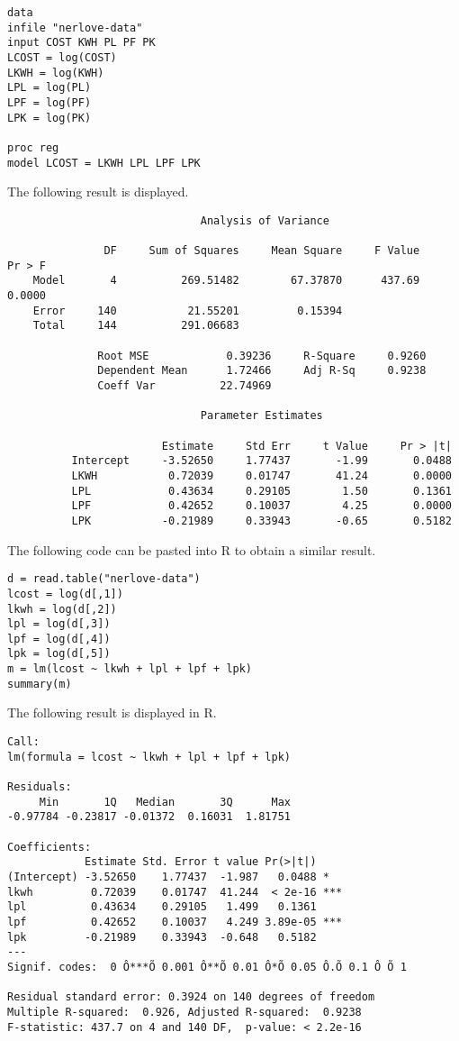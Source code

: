 \documentclass[12pt]{article}
\begin{document}
\begin{Verbatim}
data
infile "nerlove-data"
input COST KWH PL PF PK
LCOST = log(COST)
LKWH = log(KWH)
LPL = log(PL)
LPF = log(PF)
LPK = log(PK)

proc reg
model LCOST = LKWH LPL LPF LPK
\end{Verbatim}

The following result is displayed.

\begin{Verbatim}
                              Analysis of Variance

               DF     Sum of Squares     Mean Square     F Value     Pr > F
    Model       4          269.51482        67.37870      437.69     0.0000
    Error     140           21.55201         0.15394                       
    Total     144          291.06683                                       

              Root MSE            0.39236     R-Square     0.9260
              Dependent Mean      1.72466     Adj R-Sq     0.9238
              Coeff Var          22.74969                        

                              Parameter Estimates

                        Estimate     Std Err     t Value     Pr > |t|
          Intercept     -3.52650     1.77437       -1.99       0.0488
          LKWH           0.72039     0.01747       41.24       0.0000
          LPL            0.43634     0.29105        1.50       0.1361
          LPF            0.42652     0.10037        4.25       0.0000
          LPK           -0.21989     0.33943       -0.65       0.5182
\end{Verbatim}

The following code can be pasted into R to obtain a similar result.

\begin{Verbatim}
d = read.table("nerlove-data")
lcost = log(d[,1])
lkwh = log(d[,2])
lpl = log(d[,3])
lpf = log(d[,4])
lpk = log(d[,5])
m = lm(lcost ~ lkwh + lpl + lpf + lpk)
summary(m)
\end{Verbatim}

The following result is displayed in R.

\begin{Verbatim}
Call:
lm(formula = lcost ~ lkwh + lpl + lpf + lpk)

Residuals:
     Min       1Q   Median       3Q      Max 
-0.97784 -0.23817 -0.01372  0.16031  1.81751 

Coefficients:
            Estimate Std. Error t value Pr(>|t|)    
(Intercept) -3.52650    1.77437  -1.987   0.0488 *  
lkwh         0.72039    0.01747  41.244  < 2e-16 ***
lpl          0.43634    0.29105   1.499   0.1361    
lpf          0.42652    0.10037   4.249 3.89e-05 ***
lpk         -0.21989    0.33943  -0.648   0.5182    
---
Signif. codes:  0 Ô***Õ 0.001 Ô**Õ 0.01 Ô*Õ 0.05 Ô.Õ 0.1 Ô Õ 1

Residual standard error: 0.3924 on 140 degrees of freedom
Multiple R-squared:  0.926,	Adjusted R-squared:  0.9238 
F-statistic: 437.7 on 4 and 140 DF,  p-value: < 2.2e-16
\end{Verbatim}
\end{document}
